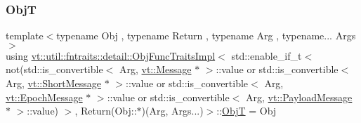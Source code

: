 \subsubsection{\texorpdfstring{ObjT}{ObjT}}
{\footnotesize\ttfamily template$<$typename Obj , typename Return , typename Arg , typename... Args$>$ \\
using \hyperlink{structvt_1_1util_1_1fntraits_1_1detail_1_1_obj_func_traits_impl}{vt\+::util\+::fntraits\+::detail\+::\+Obj\+Func\+Traits\+Impl}$<$ std\+::enable\+\_\+if\+\_\+t$<$ not(std\+::is\+\_\+convertible$<$ Arg, \hyperlink{namespacevt_a3a3ddfef40b4c90915fa43cdd5f129ea}{vt\+::\+Message} $\ast$ $>$\+::value or std\+::is\+\_\+convertible$<$ Arg, \hyperlink{namespacevt_a1125ac1da6c0bbf141e0ea0739d7602d}{vt\+::\+Short\+Message} $\ast$ $>$\+::value or std\+::is\+\_\+convertible$<$ Arg, \hyperlink{namespacevt_ad67368ffae52d7325002586b41bb150e}{vt\+::\+Epoch\+Message} $\ast$ $>$\+::value or std\+::is\+\_\+convertible$<$ Arg, \hyperlink{namespacevt_a89a92229c5622b855c02c549f83a1a68}{vt\+::\+Payload\+Message} $\ast$ $>$\+::value) $>$, Return(Obj\+::$\ast$)(Arg, Args...)$>$\+::\hyperlink{structvt_1_1util_1_1fntraits_1_1detail_1_1_obj_func_traits_impl_3_01std_1_1enable__if__t_3_01not1219121971b8d08f950169835519afd3_a863417e4886851735f953891e69aeb98}{ObjT} =  Obj}


